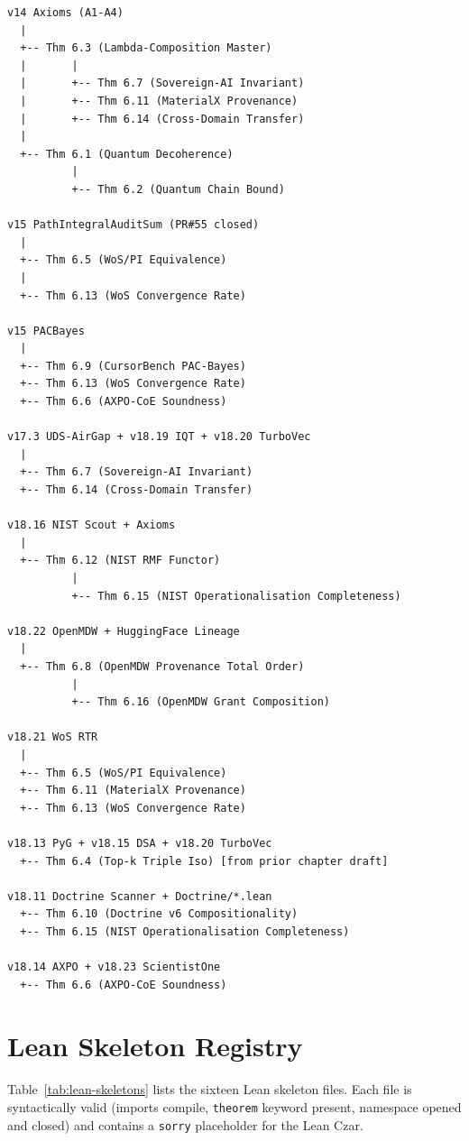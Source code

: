 \begin{verbatim}
v14 Axioms (A1-A4)
  |
  +-- Thm 6.3 (Lambda-Composition Master)
  |       |
  |       +-- Thm 6.7 (Sovereign-AI Invariant)
  |       +-- Thm 6.11 (MaterialX Provenance)
  |       +-- Thm 6.14 (Cross-Domain Transfer)
  |
  +-- Thm 6.1 (Quantum Decoherence)
          |
          +-- Thm 6.2 (Quantum Chain Bound)

v15 PathIntegralAuditSum (PR#55 closed)
  |
  +-- Thm 6.5 (WoS/PI Equivalence)
  |
  +-- Thm 6.13 (WoS Convergence Rate)

v15 PACBayes
  |
  +-- Thm 6.9 (CursorBench PAC-Bayes)
  +-- Thm 6.13 (WoS Convergence Rate)
  +-- Thm 6.6 (AXPO-CoE Soundness)

v17.3 UDS-AirGap + v18.19 IQT + v18.20 TurboVec
  |
  +-- Thm 6.7 (Sovereign-AI Invariant)
  +-- Thm 6.14 (Cross-Domain Transfer)

v18.16 NIST Scout + Axioms
  |
  +-- Thm 6.12 (NIST RMF Functor)
          |
          +-- Thm 6.15 (NIST Operationalisation Completeness)

v18.22 OpenMDW + HuggingFace Lineage
  |
  +-- Thm 6.8 (OpenMDW Provenance Total Order)
          |
          +-- Thm 6.16 (OpenMDW Grant Composition)

v18.21 WoS RTR
  |
  +-- Thm 6.5 (WoS/PI Equivalence)
  +-- Thm 6.11 (MaterialX Provenance)
  +-- Thm 6.13 (WoS Convergence Rate)

v18.13 PyG + v18.15 DSA + v18.20 TurboVec
  +-- Thm 6.4 (Top-k Triple Iso) [from prior chapter draft]

v18.11 Doctrine Scanner + Doctrine/*.lean
  +-- Thm 6.10 (Doctrine v6 Compositionality)
  +-- Thm 6.15 (NIST Operationalisation Completeness)

v18.14 AXPO + v18.23 ScientistOne
  +-- Thm 6.6 (AXPO-CoE Soundness)
\end{verbatim}

\section{Lean Skeleton Registry}
\label{sec:lean-skeletons}

Table~\ref{tab:lean-skeletons} lists the sixteen Lean skeleton files.
Each file is syntactically valid (imports compile, \texttt{theorem}
keyword present, namespace opened and closed) and contains a
\texttt{sorry} placeholder for the Lean Czar.

